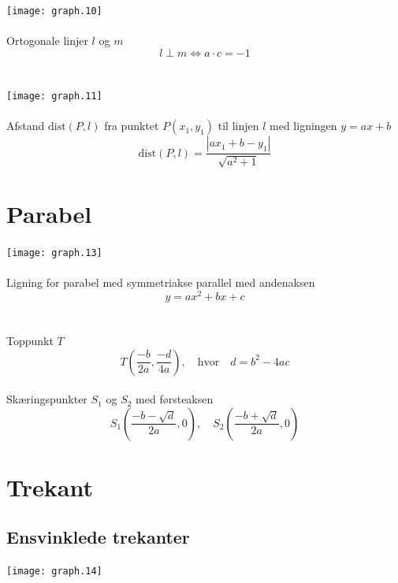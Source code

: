 \documentclass[11pt,a5paper,fleqn,leqno]{book}
\begin{document}
\texttt{[image: graph.10]}
\\
\\
Ortogonale linjer $l$ og $m$
\begin{equation}
l \perp m \Leftrightarrow a \cdot c = -1
\end{equation}
\\
\\
\texttt{[image: graph.11]}
\\
\\
Afstand $\text{dist}(P,l)$ fra punktet $P(x_1,y_1)$ til linjen $l$ med ligningen $y = ax+b$
\begin{equation}
\text{dist}(P,l) = \frac{|ax_1 + b - y_1|}{\sqrt{a^2 + 1}}
\end{equation}

\vfill

\section{Parabel}

\texttt{[image: graph.13]}
\\
\\
Ligning for parabel med symmetriakse parallel med andenaksen
\begin{equation}
y = ax^2 + bx +c
\end{equation}
\\
\\
Toppunkt $T$
\begin{equation} \label{eq:parabel_toppunkt}
T\left(\frac{-b}{2a}, \frac{-d}{4a}\right), \quad \text{hvor} \quad d = b^2 - 4ac
\end{equation}
\\
Skæringspunkter $S_1$ og $S_2$ med førsteaksen
\begin{equation} \label{eq:parabel_roedder}
S_1\left(\frac{-b - \sqrt{d}}{2a}, 0\right), \quad S_2\left(\frac{-b + \sqrt{d}}{2a}, 0\right)
\end{equation}

\newpage

\section{Trekant}

\subsection{Ensvinklede trekanter}

\texttt{[image: graph.14]}
\end{document}
